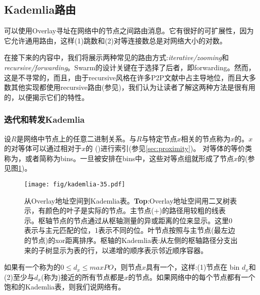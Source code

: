 \subsection{Kademlia路由\statusgreen}\label{sec:kademlia-routing}

可以使用Overlay寻址在网络中的节点之间路由消息。它有很好的可扩展性，因为它允许通用路由，这样(1)跳数和(2)对等连接数总是对网络大小的对数。

在接下来的内容中，我们将展示两种常见的路由方式:\emph{iterative/zooming}和\emph{recursive/forwarding}。Swarm的设计关键在于选择了后者，即forwarding。然而，这是不寻常的，而且，由于recursive风格在许多P2P文献中占主导地位，而且大多数其他实现都使用recursive路由(参见\cite{maymounkov2002kademlia,baumgart2007s,lua2005survey})，我们认为让读者了解这两种方法是很有用的，以便揭示它们的特性。

\subsubsection{迭代和转发Kademlia}

设$R$是网络中节点上的任意二进制关系。与$R$与特定节点$x$相关的节点称为$x$的。$x$的对等体可以通过相对于$x$的 ()进行索引(参见\ref{sec:proximity})。
对等体的等价类称为，或者简称为bins。一旦被安排在bins中，这些对等点组就形成了节点$x$的(参见图\ref{fig:kademlia-table})。 



\begin{figure}[htbp]
   \centering
    \texttt{[image: fig/kademlia-35.pdf]}
   \caption[从Overlay地址空间到Kademlia表\statusgreen]{从Overlay地址空间到Kademlia表。\textbf{Top}:Overlay地址空间用二叉树表示，有颜色的叶子是实际的节点。主节点(+)的路径用较粗的线表示。枢轴节点的节点通过从枢轴测量的异或距离的位来显示。这里0表示与主元匹配的位，1表示不同的位。叶节点按照与主节点(最左边的节点)的xor距离排序。枢轴的Kademlia表:从左侧的枢轴路径分支出来的子树显示为表的行，以递增的顺序表示邻近顺序容器。}
   \label{fig:kademlia-table}
\end{figure}

如果有一个称为的$0\leq d_x\leq \mathit{maxPO}$，则节点$x$具有一个，这样:(1)节点在 bin $d_x$和(2)至少与$d_x$(称为)接近的所有节点都是$x$的节点。如果网络中的每个节点都有一个饱和的Kademlia表，则我们说网络有。

